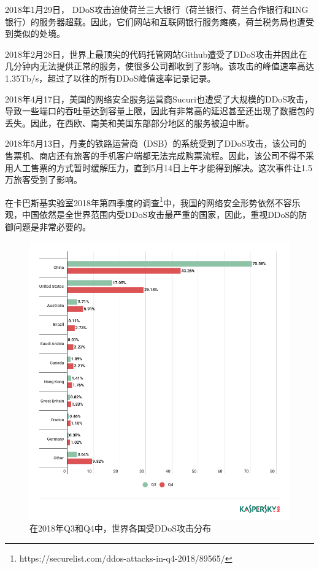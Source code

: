 2018年1月29日， DDoS攻击迫使荷兰三大银行（荷兰银行、荷兰合作银行和ING银行）的服务器超载。因此，它们网站和互联网银行服务瘫痪，荷兰税务局也遭受到类似的处境。

2018年2月28日，世界上最顶尖的代码托管网站Github遭受了DDoS攻击并因此在几分钟内无法提供正常的服务，使很多公司都收到了影响。该攻击的峰值速率高达1.35Tb/s，超过了以往的所有DDoS峰值速率记录记录。

2018年4月17日，美国的网络安全服务运营商Sucuri也遭受了大规模的DDoS攻击，导致一些端口的吞吐量达到容量上限，因此有非常高的延迟甚至还出现了数据包的丢失。因此，在西欧、南美和美国东部部分地区的服务被迫中断。

2018年5月13日，丹麦的铁路运营商（DSB）的系统受到了DDoS攻击，该公司的售票机、商店还有旅客的手机客户端都无法完成购票流程。因此，该公司不得不采用人工售票的方式暂时缓解压力，直到5月14日上午才能得到解决。这次事件让1.5万旅客受到了影响。

在卡巴斯基实验室2018年第四季度的调查\footnote{https://securelist.com/ddos-attacks-in-q4-2018/89565/}中，我国的网络安全形势依然不容乐观，中国依然是全世界范围内受DDoS攻击最严重的国家，因此，重视DDoS的防御问题是非常必要的。

\begin{figure}
    \centering
    \includegraphics[scale=0.5]{figures/en-ddos-by-countries.png}
    \caption{在2018年Q3和Q4中，世界各国受DDoS攻击分布}
    \label{fig:ddos_countries}
\end{figure}


